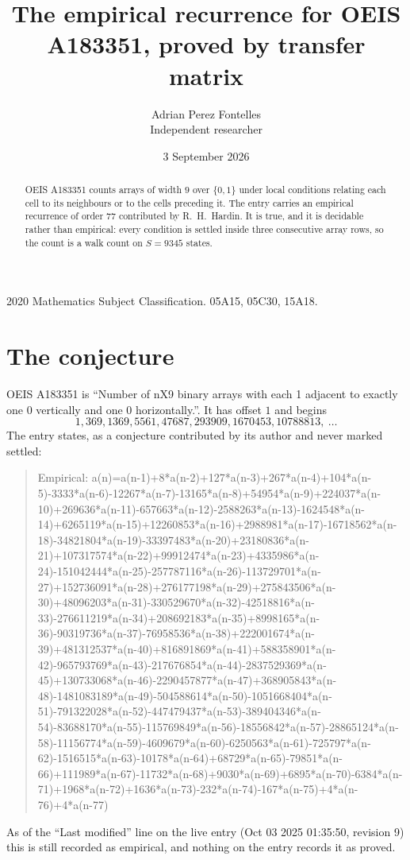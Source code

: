 \documentclass[11pt,a4paper]{article}
\title{The empirical recurrence for OEIS A183351, proved by transfer matrix}
\author{Adrian Perez Fontelles\\ \small Independent researcher}
\date{3 September 2026}
\theoremstyle{plain}
\theoremstyle{definition}
\begin{document}
\maketitle

\begin{abstract}
OEIS A183351 counts arrays of width $9$ over $\{0,1\}$ under local conditions relating each cell
to its neighbours or to the cells preceding it. The entry carries an empirical recurrence of
order $77$ contributed by R.~H.~Hardin. It is true, and it is decidable rather than
empirical: every condition is settled inside three consecutive array rows, so the count is a
walk count on $S=9345$ states.
\end{abstract}

\noindent\small 2020 Mathematics Subject Classification. 05A15, 05C30, 15A18.\normalsize

\section{The conjecture}

OEIS A183351 is ``Number of nX9 binary arrays with each 1 adjacent to exactly one 0 vertically and one 0 horizontally.''. It has offset $1$ and begins
\[
1, 369, 1369, 5561, 47687, 293909, 1670453, 10788813,\ \dots
\]
The entry states, as a conjecture contributed by its author and never marked settled:
\begin{quote}
Empirical: a(n)=a(n-1)+8*a(n-2)+127*a(n-3)+267*a(n-4)+104*a(n-5)-3333*a(n-6)-12267*a(n-7)-13165*a(n-8)+54954*a(n-9)+224037*a(n-10)+269636*a(n-11)-657663*a(n-12)-2588263*a(n-13)-1624548*a(n-14)+6265119*a(n-15)+12260853*a(n-16)+2988981*a(n-17)-16718562*a(n-18)-34821804*a(n-19)-33397483*a(n-20)+23180836*a(n-21)+107317574*a(n-22)+99912474*a(n-23)+4335986*a(n-24)-151042444*a(n-25)-257787116*a(n-26)-113729701*a(n-27)+152736091*a(n-28)+276177198*a(n-29)+275843506*a(n-30)+48096203*a(n-31)-330529670*a(n-32)-42518816*a(n-33)-276611219*a(n-34)+208692183*a(n-35)+8998165*a(n-36)-90319736*a(n-37)-76958536*a(n-38)+222001674*a(n-39)+481312537*a(n-40)+816891869*a(n-41)+588358901*a(n-42)-965793769*a(n-43)-217676854*a(n-44)-2837529369*a(n-45)+130733068*a(n-46)-2290457877*a(n-47)+368905843*a(n-48)-1481083189*a(n-49)-504588614*a(n-50)-1051668404*a(n-51)-791322028*a(n-52)-447479437*a(n-53)-389404346*a(n-54)-83688170*a(n-55)-115769849*a(n-56)-18556842*a(n-57)-28865124*a(n-58)-11156774*a(n-59)-4609679*a(n-60)-6250563*a(n-61)-725797*a(n-62)-1516515*a(n-63)-10178*a(n-64)+68729*a(n-65)-79851*a(n-66)+111989*a(n-67)-11732*a(n-68)+9030*a(n-69)+6895*a(n-70)-6384*a(n-71)+1968*a(n-72)+1636*a(n-73)-232*a(n-74)-167*a(n-75)+4*a(n-76)+4*a(n-77)
\end{quote}
As of the ``Last modified'' line on the live entry (Oct 03 2025 01:35:50, revision 9) this is still
recorded as empirical, and nothing on the entry records it as proved.
\end{document}
